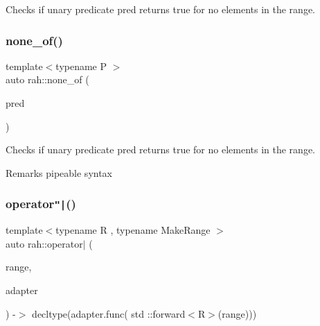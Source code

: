 Checks if unary predicate pred returns true for no elements in the range. 


\begin{DoxyCodeInclude}{0}
\DoxyCodeLine{        ));}
\end{DoxyCodeInclude}
\mbox{\label{namespacerah_aa05e58774ee8e9e05cd3e6ed2a2fa372}} 
\subsubsection{\texorpdfstring{none\_of()}{none\_of()}\hspace{0.1cm}{\footnotesize\ttfamily [2/2]}}
{\footnotesize\ttfamily template$<$typename P $>$ \\
auto rah\+::none\+\_\+of (\begin{DoxyParamCaption}\item[{P \&\&}]{pred }\end{DoxyParamCaption})}



Checks if unary predicate pred returns true for no elements in the range. 

\begin{DoxyRemark}{Remarks}
pipeable syntax
\end{DoxyRemark}

\begin{DoxyCodeInclude}{0}
\DoxyCodeLine{        ) == \textcolor{keyword}{false});}
\end{DoxyCodeInclude}
\mbox{\label{namespacerah_ab1ae71c44092414b8a22379bc0d3cd34}} 
\subsubsection{\texorpdfstring{operator\texttt{"|}()}{operator|()}}
{\footnotesize\ttfamily template$<$typename R , typename Make\+Range $>$ \\
auto rah\+::operator$\vert$ (\begin{DoxyParamCaption}\item[{R \&\&}]{range,  }\item[{\mbox{\hyperlink{structrah_1_1pipeable}{pipeable}}$<$ Make\+Range $>$ const \&}]{adapter }\end{DoxyParamCaption}) -\/$>$ decltype(adapter.\+func( std \+::forward$<$R$>$(range)))
}

